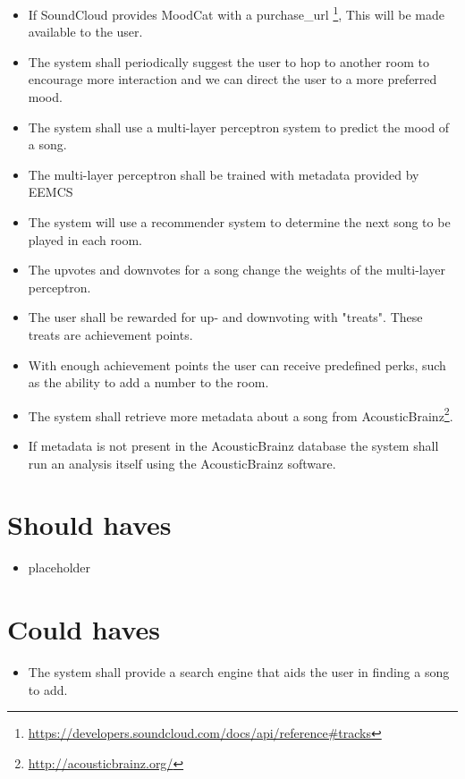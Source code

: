 \begin{itemize}
\item If SoundCloud provides MoodCat with a purchase\_url \footnote{\url{https://developers.soundcloud.com/docs/api/reference\#tracks}}, This will be made available to the user.

\item The system shall periodically suggest the user to hop to another room to encourage more interaction and we can direct the user to a more preferred mood.

\item The system shall use a multi-layer perceptron system to predict the mood of a song.

\item The multi-layer perceptron shall be trained with metadata provided by EEMCS

\item The system will use a recommender system to determine the next song to be played in each room.

\item The upvotes and downvotes for a song change the weights of the multi-layer perceptron.

\item The user shall be rewarded for up- and downvoting with "treats". These treats are achievement points.

\item With enough achievement points the user can receive predefined perks, such as the ability to add a number to the room.

\item The system shall retrieve more metadata about a song from AcousticBrainz\footnote{\url{http://acousticbrainz.org/}}.

\item If metadata is not present in the AcousticBrainz database the system shall run an analysis itself using the AcousticBrainz software.


\end{itemize}
\section{Should haves}
\begin{itemize}
\item placeholder
\end{itemize}

\section{Could haves}
\begin{itemize}
\item The system shall provide a search engine that aids the user in finding a song to add.
\end{itemize}

